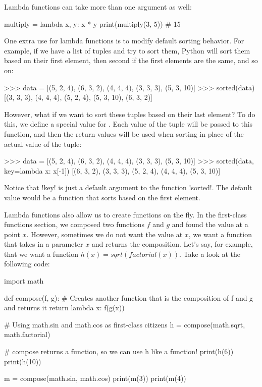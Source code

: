 \documentclass[11pt]{cselabheader}
\begin{document}
Lambda functions can take more than one argument as well:
\begin{python3code}
multiply = lambda x, y: x * y
print(multiply(3, 5)) # 15
\end{python3code}

One extra use for lambda functions is to modify default sorting behavior. For
example, if we have a list of tuples and try to sort them, Python will sort them
based on their first element, then second if the first elements are the same,
and so on:

\begin{pyconcode}
>>> data = [(5, 2, 4), (6, 3, 2), (4, 4, 4), (3, 3, 3), (5, 3, 10)]
>>> sorted(data)
[(3, 3, 3), (4, 4, 4), (5, 2, 4), (5, 3, 10), (6, 3, 2)]
\end{pyconcode}

However, what if we want to sort these tuples based on their last element? To do
this, we define a special  value for . Each
value of the tuple will be passed to this function, and then the return values
will be used when sorting in place of the actual value of the tuple:

\begin{pyconcode}
>>> data = [(5, 2, 4), (6, 3, 2), (4, 4, 4), (3, 3, 3), (5, 3, 10)]
>>> sorted(data, key=lambda x: x[-1])
[(6, 3, 2), (3, 3, 3), (5, 2, 4), (4, 4, 4), (5, 3, 10)]
\end{pyconcode}

Notice that \pythoninline!key! is just a default argument to the function 
\pythoninline!sorted!. The default value would be a function that sorts based on
the first element.

Lambda functions also allow us to create functions on the fly. In the
first-class functions section, we composed two functions $f$ and $g$ and found
the value at a point $x$. However, sometimes we do not want the value at $x$, we
want a function that takes in a parameter $x$ and returns the composition. Let's
say, for example, that we want a function $h(x) = sqrt(factorial(x))$. Take
a look at the following code:
\begin{python3code}
import math

def compose(f, g):
  # Creates another function that is the composition of f and g and returns it
  return lambda x: f(g(x))

# Using math.sin and math.cos as first-class citizens
h = compose(math.sqrt, math.factorial)

# compose returns a function, so we can use h like a function!
print(h(6))
print(h(10))

m = compose(math.sin, math.cos)
print(m(3))
print(m(4))
\end{python3code}
\end{document}
